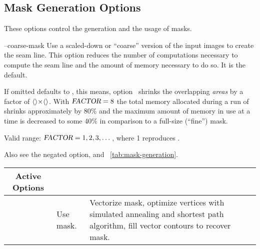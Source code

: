 

\subsection[Mask Generation Options]{\label{sec:mask-generation-options}%
  Mask Generation Options}

These options control the generation and the usage of masks.

\begin{codelist}
  \label{opt:coarse-mask}%
\item[--coarse-mask\optional{=\metavar{FACTOR}}]\itemend
  Use a scaled-down or ``coarse'' version of the input images to create the seam line.  This
  option reduces the number of computations necessary to compute the seam line and the amount of
  memory necessary to do so.  It is the default.

  If omitted  defaults to , this means,
  option~ shrinks the overlapping \emph{areas} by a factor of
  $\val{val:default-coarseness-factor}\classictimes\val{val:default-coarseness-factor}$.  With
  $\textsl{FACTOR} = 8$ the total memory allocated during a run of \App{} shrinks approximately
  by 80\% and the maximum amount of memory in use at a time is decreased to some 40\% in
  comparison to a full-size (``fine'') mask.

  Valid range: $\textsl{FACTOR} = 1, 2, 3, \dots$, where 1 reproduces .

  Also see the negated option,  and
  \tableName~\ref{tab:mask-generation}.

  \begin{table}
    \begin{tabular}{lp{.3\linewidth}p{.4\linewidth}}
      \hline
      \multicolumn{1}{c|}{Active Options} &
      \multicolumn{1}{c|}{\option{--no-optimize}} &
      \multicolumn{1}{c}{\option{--optimize}} \\
      \hline\extraheadingsep
      \option{--fine-mask} & Use \acronym{NFT} mask. & Vectorize \acronym{NFT} mask, optimize
      vertices with simulated annealing and \propername{Dijkstra's} shortest path algorithm,
      fill vector contours to recover mask. \\


\end{tabular}
\end{table}
\end{codelist}
